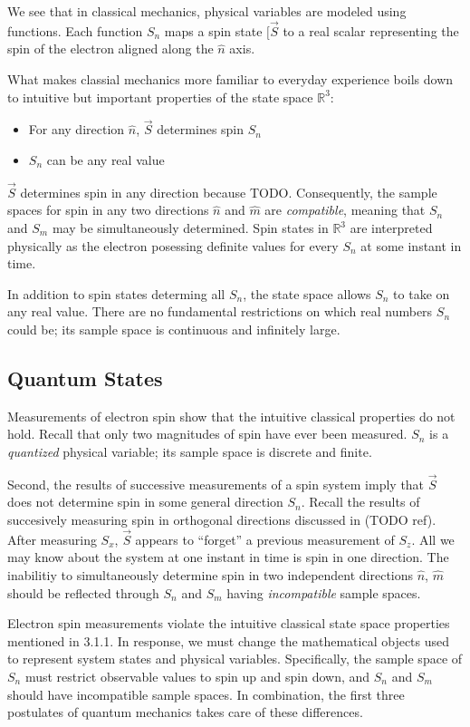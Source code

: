 We see that in classical mechanics, physical variables are modeled using functions. Each function $S_n$ maps a spin state $[\vec{S}$ to a real scalar representing the spin of the electron aligned along the $\hat{n}$ axis.

What makes classial mechanics more familiar to everyday experience boils down to intuitive but important properties of the state space $\mathbb{R}^3$:
\begin{itemize}
\item For any direction $\hat{n}$, $\vec{S}$ determines spin $S_n$
\item $S_n$ can be any real value
\end{itemize}

$\vec{S}$ determines spin in any direction because TODO. Consequently, the sample spaces for spin in any two directions $\hat{n}$ and $\hat{m}$ are \textit{compatible}, meaning that $S_n$ and $S_m$ may be simultaneously determined. Spin states in $\mathbb{R}^3$ are interpreted physically as the electron posessing definite values for every $S_n$ at some instant in time.

In addition to spin states determing all $S_n$, the state space allows $S_n$ to take on any real value. There are no fundamental restrictions on which real numbers $S_n$ could be; its sample space is continuous and infinitely large.

\subsection{Quantum States}
Measurements of electron spin show that the intuitive classical properties do not hold. Recall that only two magnitudes of spin have ever been measured. $S_n$ is a \textit{quantized} physical variable; its sample space is discrete and finite.

Second, the results of successive measurements of a spin system imply that $\vec{S}$ does not determine spin in some general direction $S_n$. Recall the results of succesively measuring spin in orthogonal directions discussed in (TODO ref). After measuring $S_x$, $\vec{S}$ appears to ``forget'' a previous measurement of $S_z$. All we may know about the system at one instant in time is spin in one direction. The inabilitiy to simultaneously determine spin in two independent directions $\hat{n}$, $\hat{m}$ should be reflected through $S_n$ and $S_m$ having \textit{incompatible} sample spaces.

Electron spin measurements violate the intuitive classical state space properties mentioned in 3.1.1. In response, we must change the mathematical objects used to represent system states and physical variables. Specifically, the sample space of $S_n$ must restrict observable values to spin up and spin down, and $S_n$ and $S_m$ should have incompatible sample spaces. In combination, the first three postulates of quantum mechanics takes care of these differences.

